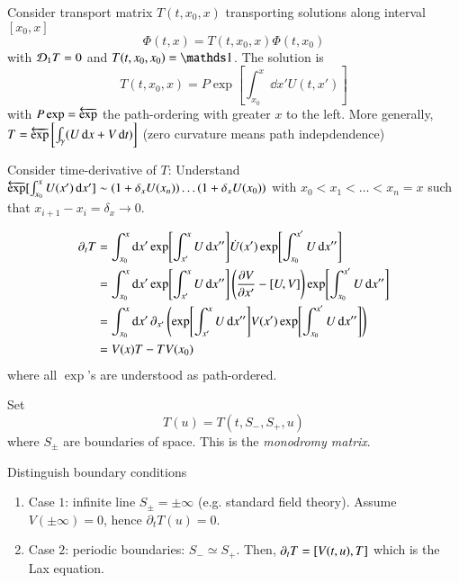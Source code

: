 Consider transport matrix $T(t, x_0, x)$ transporting solutions along interval $[x_0, x]$
\begin{equation*}
	\Phi(t, x) = T(t, x_0, x) \Phi(t, x_0)
\end{equation*}
with $\mathcal{D}_1 T = 0$ and $T(t, x_0, x_0) = \id$. The solution is 
\begin{equation}
	T(t, x_0, x) = P \exp[\int_{x_0}^x \dd{x'} U(t, x')]
	\label{math:5.3}
\end{equation}
with $P \exp = \overleftarrow{\exp}$ the path-ordering with greater $x$ to the left. More generally, $T = \overleftarrow{\exp}\left[\int_{\gamma} (U \dd{x} + V \dd{t}) \right]$ (zero curvature means path indepdendence)

Consider time-derivative of $T$: Understand $\overleftarrow{\exp} [\int_{x_0}^{x} U(x') \dd{x'}] \sim (1+\delta_x U(x_n)) \dots (1+ \delta_x U(x_0))$ with $x_0 < x_1 < \dots < x_n = x$ such that $x_{i+1} - x_i = \delta_x \rightarrow 0$.

\begin{align*}
	\partial_t T &= \int^x_{x_0} \dd{x'} \exp[\int_{x'}^x U\dd{x''} ] \dot{U}(x') \exp[\int_{x_0}^{x'} U \dd{x''}] \\
					 &= \int_{x_0}^x \dd{x'} \exp[\int_{x'}^x U \dd{x''} ] \left( \pdv{V}{x'} - \comm{U}{V} \right)  \exp[\int_{x_0}^{x'} U\dd{x''}]  \\
					 &= \int_{x_0}^{x} \dd{x'} \partial_{x'} \left( \exp[\int_{x'}^{x} U \dd{x''}] V(x') \exp[\int_{x_0}^{x'} U \dd{x''}] \right) \\
					 &= V(x) T - T V(x_0)
\end{align*}
where all $\exp$'s are understood as path-ordered.

Set 
\begin{equation}
	T(u) = T(t, S_-, S_+, u)
\end{equation}
where $S_\pm$ are boundaries of space. This is the \textit{monodromy matrix}.

Distinguish boundary conditions
\begin{enumerate}
	\item Case $1$: infinite line $S_\pm = \pm \infty$ (e.g. standard field theory). Assume $V(\pm \infty) = 0$, hence $\partial_t T(u) = 0$.
	\item Case $2$: periodic boundaries: $S_- \simeq S_+$. Then, $\partial_t T = \comm{V(t, u)}{T}$ which is the Lax equation.
\end{enumerate}


